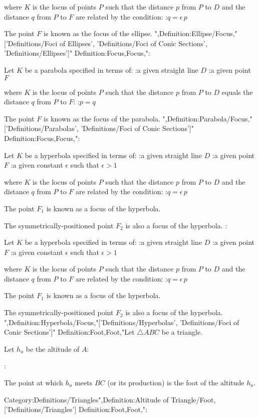 where $K$ is the locus of points $P$ such that the distance $p$ from $P$ to $D$ and the distance $q$ from $P$ to $F$ are related by the condition:
:$q = \epsilon \, p$


The point $F$ is known as the focus of the ellipse.
",Definition:Ellipse/Focus,"['Definitions/Foci of Ellipses', 'Definitions/Foci of Conic Sections', 'Definitions/Ellipses']"
Definition:Focus,Focus,":


Let $K$ be a parabola specified in terms of:
:a given straight line $D$
:a given point $F$

where $K$ is the locus of points $P$ such that the distance $p$ from $P$ to $D$ equals the distance $q$ from $P$ to $F$:
:$p = q$


The point $F$ is known as the focus of the parabola.
",Definition:Parabola/Focus,"['Definitions/Parabolas', 'Definitions/Foci of Conic Sections']"
Definition:Focus,Focus,":


Let $K$ be a hyperbola specified in terms of:
:a given straight line $D$
:a given point $F$
:a given constant $\epsilon$ such that $\epsilon > 1$

where $K$ is the locus of points $P$ such that the distance $p$ from $P$ to $D$ and the distance $q$ from $P$ to $F$ are related by the condition:
:$q = \epsilon \, p$


The point $F_1$ is known as a focus of the hyperbola.

The symmetrically-positioned point $F_2$ is also a focus of the hyperbola.
:


Let $K$ be a hyperbola specified in terms of:
:a given straight line $D$
:a given point $F$
:a given constant $\epsilon$ such that $\epsilon > 1$

where $K$ is the locus of points $P$ such that the distance $p$ from $P$ to $D$ and the distance $q$ from $P$ to $F$ are related by the condition:
:$q = \epsilon \, p$


The point $F_1$ is known as a focus of the hyperbola.

The symmetrically-positioned point $F_2$ is also a focus of the hyperbola.
",Definition:Hyperbola/Focus,"['Definitions/Hyperbolas', 'Definitions/Foci of Conic Sections']"
Definition:Foot,Foot,"Let $\triangle ABC$ be a triangle.

Let $h_a$ be the altitude of $A$:

:


The point at which $h_a$ meets $BC$ (or its production) is the foot of the altitude $h_a$.


Category:Definitions/Triangles",Definition:Altitude of Triangle/Foot,['Definitions/Triangles']
Definition:Foot,Foot,":


